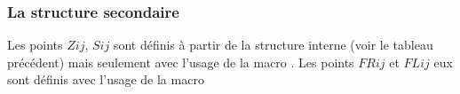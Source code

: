 \subsubsection{La structure secondaire}
Les points $Zij$, $Sij$ sont définis à partir de la structure interne (voir le tableau précédent) mais seulement avec l'usage de la macro . Les points $FRij$ et $FLij$ eux sont définis avec l'usage de la macro 

\begin{tkzexample}[small]
\end{tkzexample}
